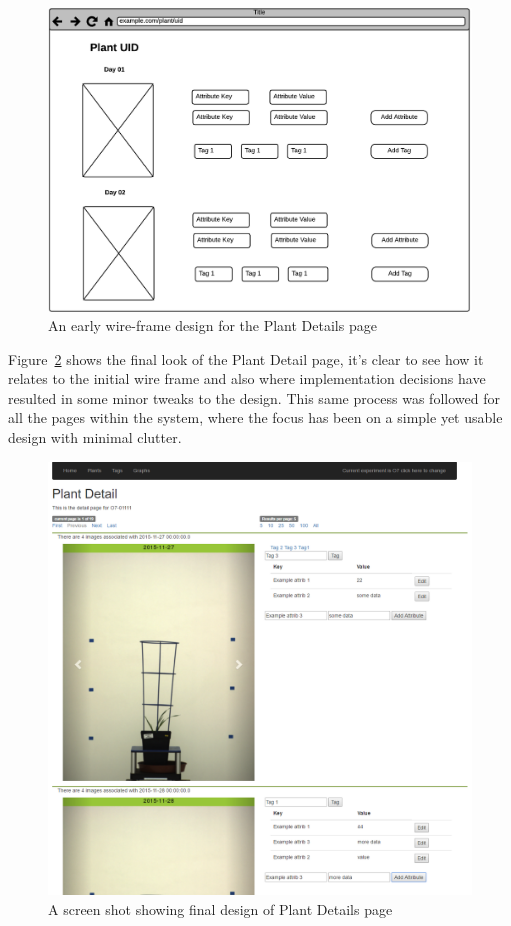 \begin{figure}[H]
    \centering
    \includegraphics[width=\textwidth]{images/design/ui1}
    \caption{An early wire-frame design for the Plant Details page}
    \label{fig:ui1}
\end{figure}

Figure~\ref{fig:ui2} shows the final look of the Plant Detail page, it's clear to see how it relates to the initial wire frame and also where implementation decisions have resulted in some minor tweaks to the design. This same process was followed for all the pages within the system, where the focus has been on a simple yet usable design with minimal clutter. 

\begin{figure}[H]
    \centering
    \includegraphics[width=\textwidth]{images/design/ui2}
    \caption{A screen shot showing final design of Plant Details page}
    \label{fig:ui2}
\end{figure}

